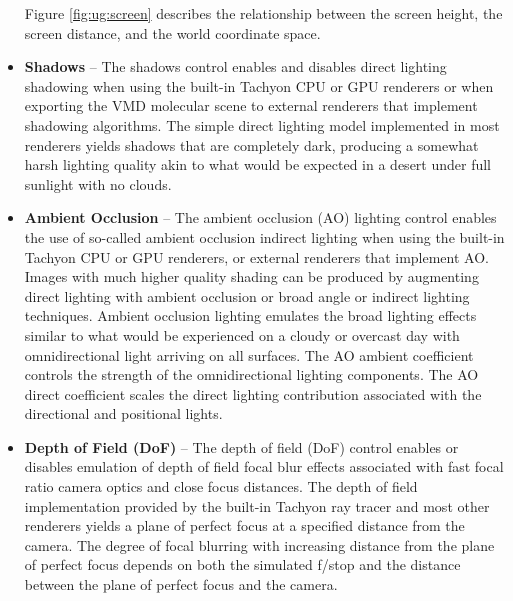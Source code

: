 \begin{itemize}
Figure \ref{fig:ug:screen} describes the relationship between the screen
height, the screen distance, and the world coordinate space.


\item {\bf Shadows} --
The shadows control enables and disables direct lighting 
shadowing when using the built-in Tachyon CPU or GPU renderers 
or when exporting the VMD molecular scene to external renderers 
that implement shadowing algorithms.
The simple direct lighting model implemented in most renderers yields
shadows that are completely dark, producing a somewhat harsh lighting
quality akin to what would be expected in a desert under full sunlight
with no clouds.  

\item {\bf Ambient Occlusion} --
The ambient occlusion (AO) lighting control enables the use of 
so-called ambient occlusion indirect lighting when using the built-in
Tachyon CPU or GPU renderers, or external renderers that implement AO.
Images with much higher quality shading can be produced by augmenting 
direct lighting with ambient occlusion or broad angle or indirect 
lighting techniques.
Ambient occlusion lighting emulates the broad lighting effects 
similar to what would be experienced on a cloudy or overcast day with
omnidirectional light arriving on all surfaces.
The AO ambient coefficient controls the strength of the omnidirectional
lighting components.  The AO direct coefficient scales the direct 
lighting contribution associated with the directional and 
positional lights.

\item {\bf Depth of Field (DoF)} --
The depth of field (DoF) control enables or disables emulation of 
depth of field focal blur effects associated with fast focal ratio
camera optics and close focus distances.  The depth of field 
implementation provided by the built-in Tachyon ray tracer and most
other renderers yields a plane of perfect focus at a specified distance
from the camera.  The degree of focal blurring with increasing distance
from the plane of perfect focus depends on both the simulated f/stop
and the distance between the plane of perfect focus and the camera.


\end{itemize}




